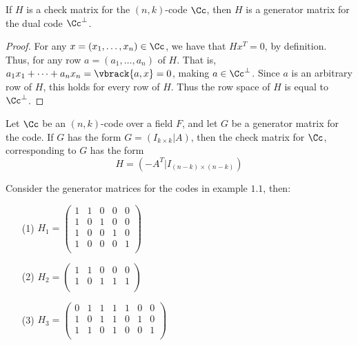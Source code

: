 \begin{lemma}\label{1.1.2}
    If $H$ is a check matrix for the $(n,k)$-code $\Cc$, then $H$ is a generator
    matrix for the dual code  $\Cc^\perp$.
\end{lemma}
\begin{proof}
    For any $x=(x_1, \dots, x_n) \in \Cc$, we have that $Hx^T=0$, by definition.
    Thus, for any row $a=(a_1, \dots, a_n)$ of $H$. That is,
    $a_1x_1+\dots+a_nx_n=\vbrack{a,x}=0$, making $a \in \Cc^\perp$. Since $a$
    is an arbitrary row of $H$, this holds for every row of  $H$. Thus the row
    space of $H$ is equal to $\Cc^\perp$.
\end{proof}

\begin{lemma}\label{1.1.3}
    Let $\Cc$ be an  $(n,k)$-code over a field $F$, and let  $G$ be a generator
    matrix for the code. If  $G$ has the form  $G=(I_{k \times k}|A)$, then the
    check matrix for $\Cc$, corresponding to $G$ has the form
    \begin{equation}
        H=(-A^T|I_{(n-k) \times (n-k)})
    \end{equation}
\end{lemma}

\begin{example}\cite{mceliece}
    Consider the generator matrices for the codes in example $1.1$, then:
    \begin{enumerate}
        \item[(1)] $H_1=\begin{pmatrix}
                    1 & 1 & 0 & 0 & 0 \\
                    1 & 0 & 1 & 0 & 0 \\
                    1 & 0 & 0 & 1 & 0 \\
                    1 & 0 & 0 & 0 & 1 \\
                  \end{pmatrix}$

        \item[(2)] $H_2=\begin{pmatrix}
                    1 & 1 & 0 & 0 & 0 \\
                    1 & 0 & 1 & 1 & 1 \\
                  \end{pmatrix}$

        \item[(3)] $H_3=\begin{pmatrix}
                    0 & 1 & 1 & 1 & 1 & 0 & 0 \\
                    1 & 0 & 1 & 1 & 0 & 1 & 0 \\
                    1 & 1 & 0 & 1 & 0 & 0 & 1 \\
                  \end{pmatrix}$
    \end{enumerate}
\end{example}

